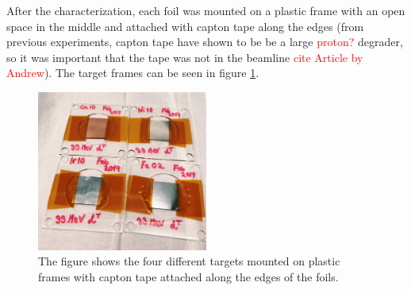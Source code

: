 \documentclass[a4paper,11pt,twoside]{book}
\begin{document}
\noindent 
After the characterization, each foil was mounted on a plastic frame with an open space in the middle and attached with capton tape along the edges (from previous experiments, capton tape have shown to be be a large \textcolor{red}{proton?} degrader, so it was important that the tape was not in the beamline \textcolor{red}{cite Article by Andrew}). The target frames can be seen in figure \ref{fig:targets_on_frame}. 

\begin{figure}
    \centering
    \includegraphics[width=0.5\textwidth]{Experiment/targets_on_frame.JPG}
    \caption{The figure shows the four different targets mounted on plastic frames with capton tape attached along the edges of the foils.}
    \label{fig:targets_on_frame}
\end{figure}
\end{document}
